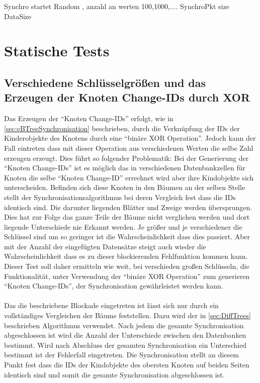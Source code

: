 \documentclass[a4paper,11pt,oneside,%
headsepline,												%
footsepline,												%
bibtotocnumbered									%
]{scrreprt}
\begin{document}
Synchro startet Random , anzahl an werten 100,1000,.... %
SynchroPkt size
DataSize

\newpage
\section{Statische Tests}
\subsection{Verschiedene Schlüsselgrößen und das Erzeugen der Knoten Change-IDs durch XOR}
\label{sec:XorError}
Das Erzeugen der \enquote{Knoten Change-IDs} erfolgt, wie in \autoref{sec:eBTreeSynchronisation} beschrieben, durch die Verknüpfung der IDs der Kinderobjekte des Knotens durch eine \enquote{binäre XOR Operation}. Jedoch kann der Fall eintreten dass mit dieser Operation aus verschiedenen Werten die selbe Zahl erzeugen erzeugt. Dies führt so folgender Problematik: Bei der Generierung der \enquote{Knoten Change-IDs} ist es möglich das in verschiedenen Datenbankzellen für Knoten die selbe \enquote{Knoten Change-ID}  errechnet wird aber ihre Kindobjekte sich unterscheiden. Befinden sich diese Knoten in den Bäumen an der selben Stelle stellt der Synchronisationsalgorithmus bei deren Vergleich fest dass die IDs identisch sind. Die darunter liegenden Blätter und Zweige werden übersprungen. Dies hat zur Folge das ganze Teile der Bäume nicht verglichen werden und dort liegende Unterschiede nie Erkannt werden. Je größer und je verschiedener die Schlüssel sind um so geringer ist die Wahrscheinlichkeit dass dies passiert. Aber mit der Anzahl der eingefügten Datensätze steigt auch wieder die Wahrscheinlichkeit dass es zu dieser blockierenden Fehlfunktion kommen kann. Dieser Test soll daher ermitteln wie weit, bei verschieden großen Schlüsseln, die Funktionalität, unter Verwendung der \enquote{binäre XOR Operation} zum generieren \enquote{Knoten Change-IDs}, der Synchronisation gewährleistet werden kann.\\\\
Das die beschriebene Blockade eingetreten ist lässt sich nur durch ein vollständiges Vergleichen der Bäume feststellen. Dazu wird der in \autoref{sec:DiffTrees} beschrieben Algorithmus verwendet. Nach jedem die gesamte Synchronisation abgeschlossen ist wird die Anzahl der Unterschiede zwischen den Datenbanken bestimmt. Wird nach Abschluss der gesamten Synchronisation ein Unterschied bestimmt ist der Fehlerfall eingetreten. Die Synchronisation stellt an diesem Punkt fest dass die IDs der Kindobjekte des obersten Knoten auf beiden Seiten identisch sind und somit die gesamte Synchronisation abgeschlossen ist. \\\\
\end{document}
